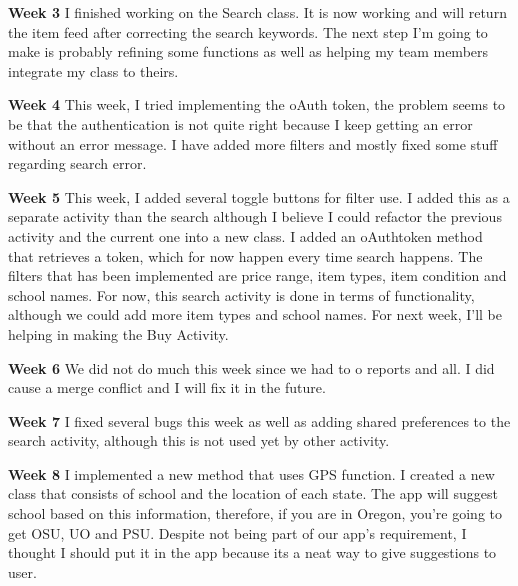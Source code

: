 \documentclass[journal,compsoc, 10pt, draftclsnofoot, onecolumn]{IEEEtran}
\begin{document}
\textbf{Week 3}\newline
I finished working on the Search class. It is now working and will return the item feed after
correcting the search keywords. The next step I'm going to make is probably refining some
functions as well as helping my team members integrate my class to theirs.\newline

\textbf{Week 4}\newline
This week, I tried implementing the oAuth token, the problem seems to be that the
authentication is not quite right because I keep getting an error without an error message. I
have added more filters and mostly fixed some stuff regarding search error.\newline

\textbf{Week 5}\newline
This week, I added several toggle buttons for filter use. I added this as a separate activity
than the search although I believe I could refactor the previous activity and the current one
into a new class. I added an oAuthtoken method that retrieves a token, which for now happen
every time search happens. The filters that has been implemented are price range, item types,
item condition and school names. For now, this search activity is done in terms of
functionality, although we could add more item types and school names. For next week, I'll be
helping in making the Buy Activity.\newline

\textbf{Week 6}\newline
We did not do much this week since we had to o reports and all. I did cause a merge conflict
and I will fix it in the future.\newline

\textbf{Week 7}\newline
I fixed several bugs this week as well as adding shared preferences to the search activity,
although this is not used yet by other activity.\newline

\textbf{Week 8}\newline
I implemented a new method that uses GPS function. I created a new class that consists of
school and the location of each state. The app will suggest school based on this information,
therefore, if you are in Oregon, you're going to get OSU, UO and PSU. Despite not being part of 
our app's requirement, I thought I should put it in the app because its a neat way to give
suggestions to user.\newline
\end{document}
